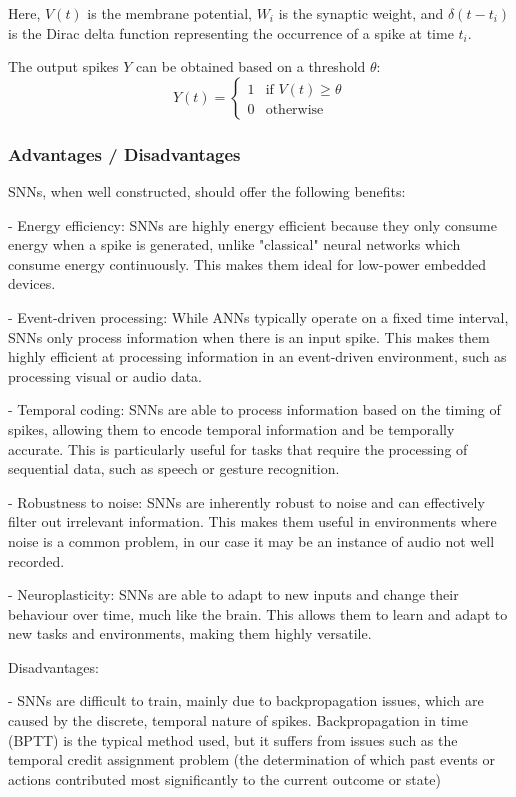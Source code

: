 \documentclass[11pt]{article}
\begin{document}
Here, \(V(t)\) is the membrane potential, \(W_i\) is the synaptic weight, and \(\delta(t - t_i)\) is the Dirac delta function representing the occurrence of a spike at time \(t_i\).

The output spikes \(Y\) can be obtained based on a threshold \( \theta \):
$$
  Y(t) =
  \begin{cases}
    1 & \text{if } V(t) \geq \theta \\
    0 & \text{otherwise}
  \end{cases}
$$

\subsubsection{Advantages / Disadvantages}


SNNs, when well constructed, should offer the following benefits:

- Energy efficiency: SNNs are highly energy efficient because they only consume energy when a spike is generated, unlike "classical" neural networks which consume energy continuously. This makes them ideal for low-power embedded devices.

- Event-driven processing: While ANNs typically operate on a fixed time interval, SNNs only process information when there is an input spike. This makes them highly efficient at processing information in an event-driven environment, such as processing visual or audio data.

- Temporal coding: SNNs are able to process information based on the timing of spikes, allowing them to encode temporal information and be temporally accurate. This is particularly useful for tasks that require the processing of sequential data, such as speech or gesture recognition.

- Robustness to noise: SNNs are inherently robust to noise and can effectively filter out irrelevant information. This makes them useful in environments where noise is a common problem, in our case it may be an instance of audio not well recorded.

- Neuroplasticity: SNNs are able to adapt to new inputs and change their behaviour over time, much like the brain. This allows them to learn and adapt to new tasks and environments, making them highly versatile.


Disadvantages:

- SNNs are difficult to train, mainly due to backpropagation issues, which are caused by the discrete, temporal nature of spikes. Backpropagation in time (BPTT) is the typical method used, but it suffers from issues such as the temporal credit assignment problem (the determination of which past events or actions contributed most significantly to the current outcome or state)
\end{document}
